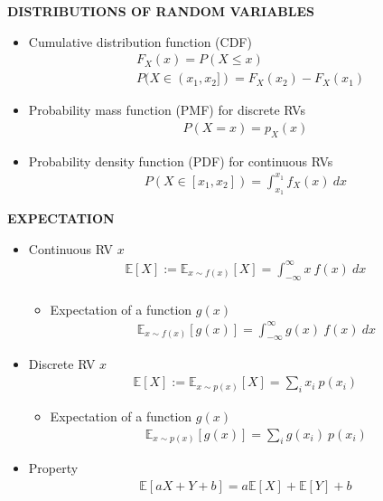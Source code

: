 \begin{whitebox}{\textbf{DISTRIBUTIONS OF RANDOM VARIABLES}}
    \begin{itemize}
        \item Cumulative distribution function (CDF)
        \begin{align*}
            &F_X(x)=P(X\leq x)\\
            &P(X\in(x_1,x_2])=F_X(x_2)-F_X(x_1)
        \end{align*}
        \item Probability mass function (PMF) for discrete RVs
        \begin{align*}
            P(X=x)=p_X(x)
        \end{align*}
        \item Probability density function (PDF) for continuous RVs
        \begin{align*}
            P(X\in[x_1,x_2])=\int_{x_1}^{x_1}f_X(x)\ dx
        \end{align*}
    \end{itemize}
\end{whitebox}

\begin{whitebox}{\textbf{EXPECTATION}}
    \begin{itemize}
        \item Continuous RV $x$
        \begin{align*}
            \mathbb{E}[X]:=\mathbb{E}_{x\sim f(x)}[X]=\int_{-\infty}^{\infty}x\ f(x)\ dx\\
        \end{align*}
        \begin{itemize}
            \item Expectation of a function $g(x)$
            \begin{align*}
                \mathbb{E}_{x\sim f(x)}[g(x)]=\int_{-\infty}^{\infty}g(x)\ f(x)\ dx
            \end{align*}
        \end{itemize}
        \item Discrete RV $x$
        \begin{align*}
            \mathbb{E}[X]:=\mathbb{E}_{x\sim p(x)}[X]=\sum_i x_i\ p(x_i)
        \end{align*}
        \begin{itemize}
            \item Expectation of a function $g(x)$
            \begin{align*}
                \mathbb{E}_{x\sim p(x)}[g(x)]=\sum_i g(x_i)\ p(x_i)
            \end{align*}
        \end{itemize}
        \item Property
        \begin{align*}
            \mathbb{E}[aX+Y+b]=a\mathbb{E}[X]+\mathbb{E}[Y]+b\\
        \end{align*}
    \end{itemize}
\end{whitebox}

